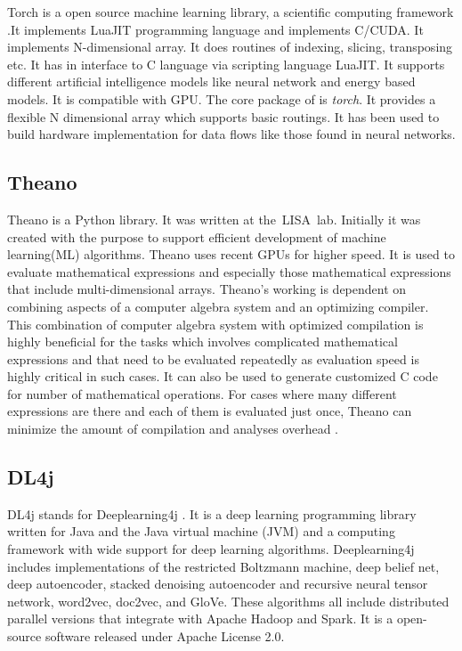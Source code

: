     Torch is a open source machine learning library, a scientific
    computing framework \cite{www-torch} .It implements LuaJIT
    programming language and implements C/CUDA. It implements
    N-dimensional array. It does routines of indexing, slicing,
    transposing etc. It has in interface to C language via scripting
    language LuaJIT. It supports different artificial intelligence
    models like neural network and energy based models. It is
    compatible with GPU.  The core package of is \textit{torch}. It provides
    a flexible N dimensional array which supports basic routings. It
    has been used to build hardware implementation for data flows like
    those found in neural networks.
    
    
\subsection{Theano}
    
    Theano is a Python library. It was written at the LISA lab.
    Initially it was created with the purpose to support efficient
    development of machine learning(ML) algorithms.  Theano uses
    recent GPUs for higher speed.  It is used to evaluate mathematical
    expressions and especially those mathematical expressions that
    include multi-dimensional arrays.  Theano’s working is dependent
    on combining aspects of a computer algebra system and an
    optimizing compiler.  This combination of computer algebra system
    with optimized compilation is highly beneficial for the tasks
    which involves complicated mathematical expressions and that need
    to be evaluated repeatedly as evaluation speed is highly critical
    in such cases.  It can also be used to generate customized C code
    for number of mathematical operations.  For cases where many
    different expressions are there and each of them is evaluated just
    once, Theano can minimize the amount of compilation and analyses
    overhead \cite{www-theano}.
    
\subsection{DL4j}

    DL4j stands for Deeplearning4j \cite{www-dl4j}. It is a deep
    learning programming library written for Java and the Java virtual
    machine (JVM) and a computing framework with wide support for deep
    learning algorithms. Deeplearning4j includes implementations of
    the restricted Boltzmann machine, deep belief net, deep
    autoencoder, stacked denoising autoencoder and recursive neural
    tensor network, word2vec, doc2vec, and GloVe. These algorithms all
    include distributed parallel versions that integrate with Apache
    Hadoop and Spark. It is a open-source software released under
    Apache License 2.0.

